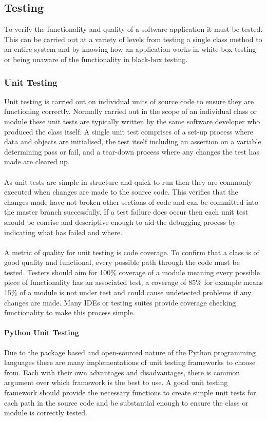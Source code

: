 \subsection{Testing}
	To verify the functionality and quality of a software application it must be tested. This can be carried out at a variety of levels from testing a single class method to an entire system and by knowing how an application works in white-box testing or being unaware of the functionality in black-box testing.
	\subsubsection{Unit Testing}
		Unit testing is carried out on individual units of source code to ensure they are functioning correctly. Normally carried out in the scope of an individual class or module these unit tests are typically written by the same software developer who produced the class itself. A single unit test comprises of a set-up process where data and objects are initialised, the test itself including an assertion on a variable determining pass or fail, and a tear-down process where any changes the test has made are cleared up.
		\\\\
		As unit tests are simple in structure and quick to run then they are commonly executed when changes are made to the source code. This verifies that the changes made have not broken other sections of code and can be committed into the master branch successfully. If a test failure does occur then each unit test should be concise and descriptive enough to aid the debugging process by indicating what has failed and where.
		\\\\
		A metric of quality for unit testing is code coverage. To confirm that a class is of good quality and functional, every possible path through the code must be tested. Testers should aim for 100\% coverage of a module meaning every possible piece of functionality has an associated test, a coverage of 85\% for example means 15\% of a module is not under test and could cause undetected problems if any changes are made. Many IDEs or testing suites provide coverage checking functionality to make this process simple.
		\paragraph{Python Unit Testing}
			Due to the package based and open-sourced nature of the Python programming languages there are many implementations of unit testing frameworks to choose from. Each with their own advantages and disadvantages, there is common argument over which framework is the best to use. A good unit testing framework should provide the necessary functions to create simple unit tests for each path in the source code and be substantial enough to ensure the class or module is correctly tested. 

